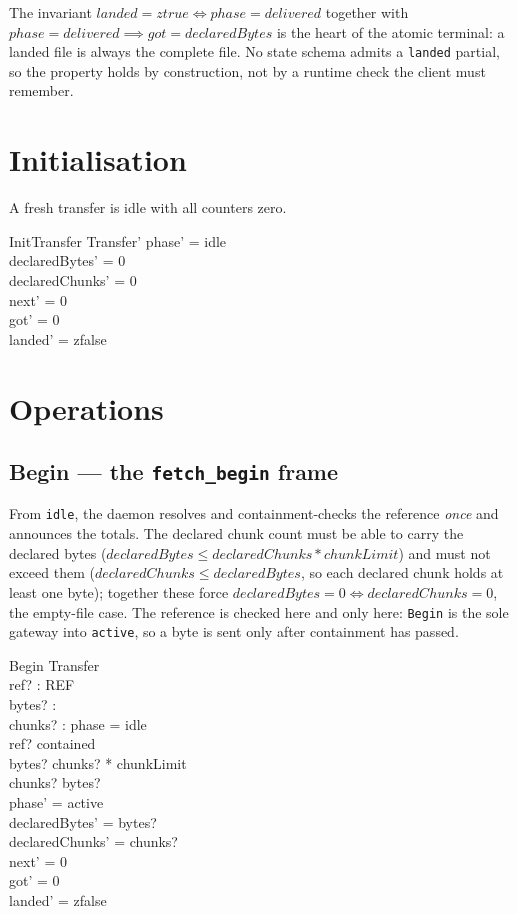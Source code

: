 \documentclass[a4paper,10pt,fleqn]{article}
\begin{document}
The invariant $landed = ztrue \iff phase = delivered$ together with
$phase = delivered \implies got = declaredBytes$ is the heart of the atomic
terminal: a landed file is always the complete file. No state schema admits a
\texttt{landed} partial, so the property holds by construction, not by a runtime
check the client must remember.

\section{Initialisation}

A fresh transfer is idle with all counters zero.

\begin{schema}{InitTransfer}
  Transfer'
  \where
  phase' = idle \\
  declaredBytes' = 0 \\
  declaredChunks' = 0 \\
  next' = 0 \\
  got' = 0 \\
  landed' = zfalse
\end{schema}

\section{Operations}

\subsection{Begin --- the \texttt{fetch\_begin} frame}

From \texttt{idle}, the daemon resolves and containment-checks the reference
\emph{once} and announces the totals. The declared chunk count must be able to
carry the declared bytes ($declaredBytes \leq declaredChunks * chunkLimit$) and
must not exceed them ($declaredChunks \leq declaredBytes$, so each declared chunk
holds at least one byte); together these force $declaredBytes = 0 \iff
declaredChunks = 0$, the empty-file case. The reference is checked here and only
here: \texttt{Begin} is the sole gateway into \texttt{active}, so a byte is sent
only after containment has passed.

\begin{schema}{Begin}
  \Delta Transfer \\
  ref? : REF \\
  bytes? : \nat \\
  chunks? : \nat
  \where
  phase = idle \\
  ref? \in contained \\
  bytes? \leq chunks? * chunkLimit \\
  chunks? \leq bytes? \\
  phase' = active \\
  declaredBytes' = bytes? \\
  declaredChunks' = chunks? \\
  next' = 0 \\
  got' = 0 \\
  landed' = zfalse
\end{schema}
\end{document}
